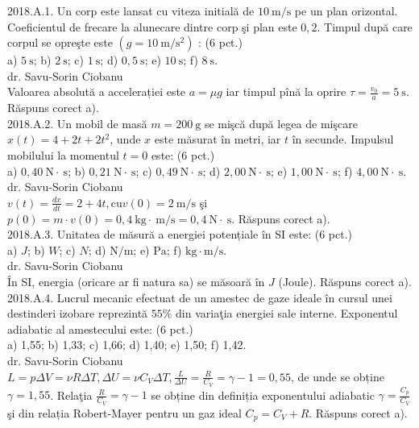 
2018.A.1. Un corp este lansat cu viteza initială de $10 \mathrm{~m} / \mathrm{s}$ pe un plan orizontal. Coeficientul de frecare la alunecare dintre corp şi plan este $0,2$. Timpul după care corpul se opreşte este $\left(g=10 \mathrm{~m} / \mathrm{s}^{2}\right)$ : (6 pct.)\\ a) $5 \mathrm{~s}$; b) $2 \mathrm{~s}$; c) $1 \mathrm{~s}$; d) $0,5 \mathrm{~s}$; e) $10 \mathrm{~s}$; f) $8 \mathrm{~s}$.\\ dr. Savu-Sorin Ciobanu\\ Valoarea absolută a accelerației este $a=\mu g$ iar timpul pînă la oprire $\tau=\frac{v_{0}}{a}=5 \mathrm{~s}$. Răspuns corect a).\\

2018.A.2. Un mobil de masă $m=200 \mathrm{~g}$ se mişcă după legea de mişcare $x(t)=4+2 t+2 t^{2}$, unde $x$ este măsurat în metri, iar $t$ în secunde. Impulsul mobilului la momentul $t=0$ este: (6 pct.)\\ a) $0,40 \mathrm{~N} \cdot \mathrm{~s}$; b) $0,21 \mathrm{~N} \cdot \mathrm{~s}$; c) $0,49 \mathrm{~N} \cdot \mathrm{~s}$; d) $2,00 \mathrm{~N} \cdot \mathrm{~s}$; e) $1,00 \mathrm{~N} \cdot \mathrm{~s}$; f) $4,00 \mathrm{~N} \cdot \mathrm{~s}$.\\ dr. Savu-Sorin Ciobanu\\ $v(t)=\frac{d x}{d t}=2+4 t, \mathrm{cu} v(0)=2 \mathrm{~m} / \mathrm{s}$ şi $p(0)=m \cdot v(0)=0,4 \mathrm{~kg} \cdot \mathrm{~m} / \mathrm{s}=0,4 \mathrm{~N} \cdot \mathrm{~s}$. Răspuns corect a).\\

2018.A.3. Unitatea de măsură a energiei potențiale în SI este: (6 pct.)\\ a) $J$; b) $W$; c) $N$; d) $\mathrm{N} / \mathrm{m}$; e) $\mathrm{Pa}$; f) $\mathrm{kg} \cdot \mathrm{m} / \mathrm{s}$.\\ dr. Savu-Sorin Ciobanu\\ În SI, energia (oricare ar fi natura sa) se măsoară în $J$ (Joule). Răspuns corect a).\\

2018.A.4. Lucrul mecanic efectuat de un amestec de gaze ideale în cursul unei destinderi izobare reprezintă $55 \%$ din variaţia energiei sale interne. Exponentul adiabatic al amestecului este: (6 pct.)\\ a) 1,55; b) 1,33; c) 1,66; d) 1,40; e) 1,50; f) 1,42.\\ dr. Savu-Sorin Ciobanu\\ $L=p \Delta V=\nu R \Delta T, \Delta U=\nu C_{V} \Delta T, \frac{L}{\Delta U}=\frac{R}{C_{V}}=\gamma-1=0,55$, de unde se obține $\gamma=1,55$. Relaţia $\frac{R}{C_{V}}=\gamma-1$ se obține din definiția exponentului adiabatic $\gamma=\frac{C_{p}}{C_{V}}$ şi din relația Robert-Mayer pentru un gaz ideal $C_{p}=C_{V}+R$. Răspuns corect a).\\ 

